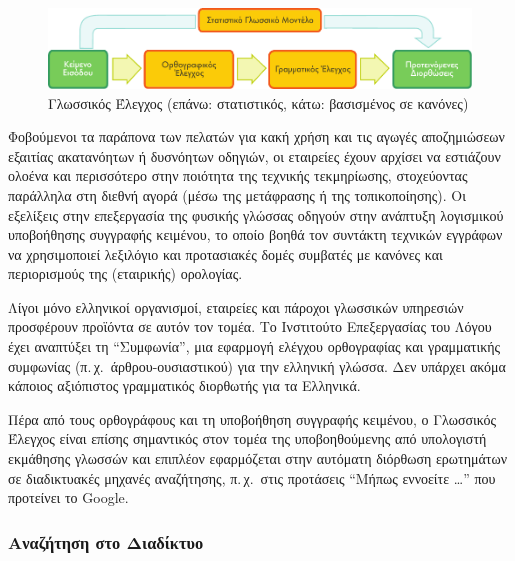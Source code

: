 \documentclass[]{../../metanetpaper}
\begin{document}
\begin{multicols}{2}
\begin{figure}[htb]
  \center
  \includegraphics[width=\textwidth]{../_media/greek/language_checking}
  \caption{Γλωσσικός Έλεγχος (επάνω: στατιστικός, κάτω: βασισμένος σε κανόνες)}
  \label{fig:langcheckingaarch_de}
\end{figure}

Φοβούμενοι τα παράπονα των πελατών για κακή χρήση και τις αγωγές αποζημιώσεων εξαιτίας ακατανόητων ή δυσνόητων οδηγιών, οι εταιρείες έχουν αρχίσει να εστιάζουν ολοένα και περισσότερο  στην ποιότητα της τεχνικής τεκμηρίωσης, στοχεύοντας παράλληλα στη διεθνή αγορά (μέσω της μετάφρασης ή της τοπικοποίησης). Οι εξελίξεις στην επεξεργασία της φυσικής γλώσσας οδηγούν στην ανάπτυξη λογισμικού υποβοήθησης συγγραφής κειμένου, το οποίο βοηθά τον συντάκτη τεχνικών εγγράφων να χρησιμοποιεί λεξιλόγιο και προτασιακές δομές  συμβατές με κανόνες και περιορισμούς της  (εταιρικής) ορολογίας. 

Λίγοι μόνο ελληνικοί οργανισμοί, εταιρείες και πάροχοι γλωσσικών υπηρεσιών προσφέρουν προϊόντα σε αυτόν τον τομέα. Το Ινστιτούτο Επεξεργασίας του Λόγου έχει αναπτύξει τη “Συμφωνία”, μια εφαρμογή ελέγχου ορθογραφίας και γραμματικής συμφωνίας (π.\,χ.~άρθρου-ουσιαστικού)  για την ελληνική γλώσσα. Δεν υπάρχει ακόμα κάποιος αξιόπιστος γραμματικός διορθωτής για τα Ελληνικά.

Πέρα από τους ορθογράφους και τη υποβοήθηση συγγραφής κειμένου, ο Γλωσσικός Έλεγχος είναι επίσης σημαντικός στον τομέα της υποβοηθούμενης από υπολογιστή εκμάθησης γλωσσών και επιπλέον εφαρμόζεται στην αυτόματη διόρθωση ερωτημάτων σε διαδικτυακές μηχανές αναζήτησης, π.\,χ.~στις προτάσεις ``Μήπως εννοείτε \dots'' που προτείνει το Google.

\subsubsection{Αναζήτηση στο Διαδίκτυο}


\end{multicols}
\end{document}
